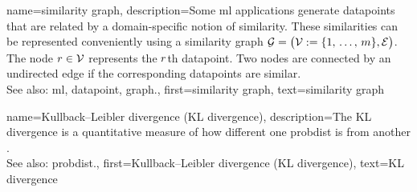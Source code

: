  {name={similarity graph}, 
 	description={Some \gls{ml} applications generate \glspl{datapoint} that 
 		are related by a domain-specific notion of similarity. These similarities can be 
 		represented conveniently using a similarity \gls{graph} $\mathcal{G} = \big(\mathcal{V} := \{1, \,\ldots, \,m\}, \mathcal{E}\big)$. 
 		The node $r \in \mathcal{V}$ represents the $r$th \gls{datapoint}. Two 
 		nodes are connected by an undirected edge if the corresponding \glspl{datapoint} are similar. 
				\\
		See also: \gls{ml}, \gls{datapoint}, \gls{graph}.},
 	first={similarity graph},
	text={similarity graph} 
}
 
 
 {name={Kullback–Leibler divergence (KL divergence)}, 
 	description={The KL divergence is a quantitative 
 		 measure of how different one \gls{probdist} is from another \cite{coverthomas}.  
		 		\\
		See also: \gls{probdist}.},
 	first={Kullback–Leibler divergence (KL divergence)},
	text={KL divergence} 
}

